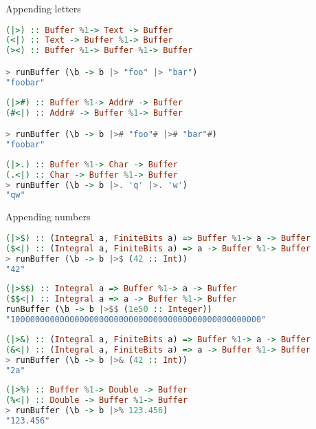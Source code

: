 \documentclass[handout]{beamer}
\begin{document}
\begin{frame}[fragile]{Appending letters}

\begin{lstlisting}[language=Haskell]
(|>) :: Buffer %1-> Text -> Buffer
(<|) :: Text -> Buffer %1-> Buffer
(><) :: Buffer %1-> Buffer %1-> Buffer

> runBuffer (\b -> b |> "foo" |> "bar")
"foobar"
\end{lstlisting}
\pause
\begin{lstlisting}[language=Haskell]
(|>#) :: Buffer %1-> Addr# -> Buffer
(#<|) :: Addr# -> Buffer %1-> Buffer

> runBuffer (\b -> b |># "foo"# |># "bar"#)
"foobar"
\end{lstlisting}
\pause
\begin{lstlisting}[language=Haskell]
(|>.) :: Buffer %1-> Char -> Buffer
(.<|) :: Char -> Buffer %1-> Buffer
> runBuffer (\b -> b |>. 'q' |>. 'w')
"qw"
\end{lstlisting}

\end{frame}

\begin{frame}[fragile]{Appending numbers}

\small
\begin{lstlisting}[language=Haskell]
(|>$) :: (Integral a, FiniteBits a) => Buffer %1-> a -> Buffer
($<|) :: (Integral a, FiniteBits a) => a -> Buffer %1-> Buffer
> runBuffer (\b -> b |>$ (42 :: Int))
"42"
\end{lstlisting}
\pause
\begin{lstlisting}[language=Haskell]
(|>$$) :: Integral a => Buffer %1-> a -> Buffer
($$<|) :: Integral a => a -> Buffer %1-> Buffer
runBuffer (\b -> b |>$$ (1e50 :: Integer))
"100000000000000000000000000000000000000000000000000"
\end{lstlisting}
\pause
\begin{lstlisting}[language=Haskell]
(|>&) :: (Integral a, FiniteBits a) => Buffer %1-> a -> Buffer
(&<|) :: (Integral a, FiniteBits a) => a -> Buffer %1-> Buffer
> runBuffer (\b -> b |>& (42 :: Int))
"2a"
\end{lstlisting}
\pause
\begin{lstlisting}[language=Haskell]
(|>%) :: Buffer %1-> Double -> Buffer
(%<|) :: Double -> Buffer %1-> Buffer
> runBuffer (\b -> b |>% 123.456)
"123.456"
\end{lstlisting}

\end{frame}
\end{document}
